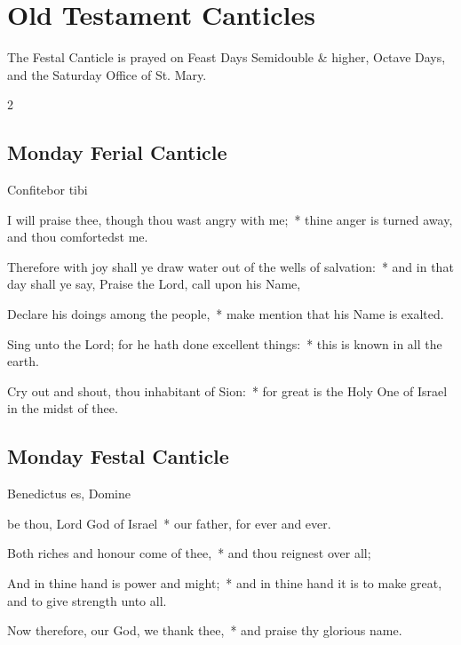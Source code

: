 \section{Old Testament Canticles}\label{OT}
\begin{secrubric}
    The Festal Canticle is prayed on Feast Days Semidouble \& higher, Octave Days, and the Saturday Office of St. Mary.
\end{secrubric}

\begin{multicols}{2}
\subsection{Monday Ferial Canticle}

\begin{inhead}
Confitebor tibi
\end{inhead}

 I will praise thee, though thou wast angry with me;~* thine anger is turned away, and thou comfortedst me.\par
{}
Therefore with joy shall ye draw water out of the wells of salvation:~* and in that day shall ye say, Praise the Lord, call upon his Name,\par
Declare his doings among the people,~* make mention that his Name is exalted.\par
Sing unto the Lord; for he hath done excellent things:~* this is known in all the earth.\par
Cry out and shout, thou inhabitant of Sion:~* for great is the Holy One of Israel in the midst of thee.

\subsection{Monday Festal Canticle}

\begin{inhead}
Benedictus es, Domine
\end{inhead}

 be thou, Lord God of Israel~* our father, for ever and ever.\par
{}
Both riches and honour come of thee,~* and thou reignest over all;\par
And in thine hand is power and might;~* and in thine hand it is to make great, and to give strength unto all.\par
Now therefore, our God, we thank thee,~* and praise thy glorious name.


\end{multicols}
